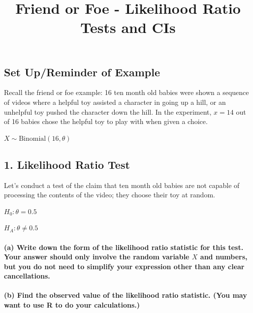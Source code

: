 \documentclass[]{article}
\title{Friend or Foe - Likelihood Ratio Tests and CIs}
\author{}
\date{}
\let\oldparagraph\paragraph
\renewcommand{\paragraph}[1]{\oldparagraph{#1}\mbox{}}
\begin{document}
\maketitle

\subsection{Set Up/Reminder of Example}\label{set-upreminder-of-example}

Recall the friend or foe example: 16 ten month old babies were shown a
sequence of videos where a helpful toy assisted a character in going up
a hill, or an unhelpful toy pushed the character down the hill. In the
experiment, \(x = 14\) out of 16 babies chose the helpful toy to play
with when given a choice.

\(X \sim \text{Binomial}(16, \theta)\)

\subsection{1. Likelihood Ratio Test}\label{likelihood-ratio-test}

Let's conduct a test of the claim that ten month old babies are not
capable of processing the contents of the video; they choose their toy
at random.

\(H_0: \theta = 0.5\)

\(H_A: \theta \neq 0.5\)

\paragraph{\texorpdfstring{(a) Write down the form of the likelihood
ratio statistic for this test. Your answer should only involve the
random variable \(X\) and numbers, but you do not need to simplify your
expression other than any clear
cancellations.}{(a) Write down the form of the likelihood ratio statistic for this test. Your answer should only involve the random variable X and numbers, but you do not need to simplify your expression other than any clear cancellations.}}\label{a-write-down-the-form-of-the-likelihood-ratio-statistic-for-this-test.-your-answer-should-only-involve-the-random-variable-x-and-numbers-but-you-do-not-need-to-simplify-your-expression-other-than-any-clear-cancellations.}

\vspace{6cm}

\paragraph{(b) Find the observed value of the likelihood ratio
statistic. (You may want to use R to do your
calculations.)}\label{b-find-the-observed-value-of-the-likelihood-ratio-statistic.-you-may-want-to-use-r-to-do-your-calculations.}
\end{document}
